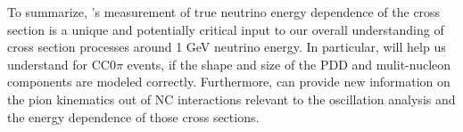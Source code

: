 To summarize, \nuprismlite's measurement of true neutrino energy dependence of the cross section is a unique and potentially critical input to our overall understanding of cross section processes around 1 GeV neutrino energy. In particular, \nuprismlite will help us understand for CC$0\pi$ events, if the shape and size of the PDD and mulit-nucleon components are modeled correctly. Furthermore, \nuprismlite can provide new information on the pion kinematics out of NC interactions relevant to the oscillation analysis and the energy dependence of those cross sections.

\clearpage
